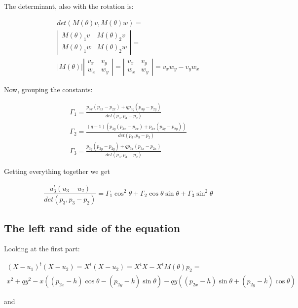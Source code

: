 \documentclass{article}
\begin{document}
The determinant, also with the rotation is:

\begin{align*}
det(M(\theta)v, M(\theta)w)=\\
\left|\begin{array}{cc}M(\theta)_1 v & M(\theta)_2v\\ M(\theta)_1 w & M(\theta)_2w\end{array}\right|=\\
|M(\theta)|\left|\begin{array}{cc} v_x & v_y \\ w_x & w_y \end{array}\right|=\left|\begin{array}{cc} v_x & v_y \\ w_x & w_y \end{array}\right|=v_xw_y - v_yw_x
\end{align*}

Now, grouping the constants:

\begin{align*}
\Gamma_1 = \frac{p_{3x}(p_{3x}-p_{2x}) + qp_{3y}(p_{3y}-p_{2y})}{det(p_3, p_3-p_2)}\\
\Gamma_2 = \frac{(q-1)(p_{3y}(p_{3x}-p_{2x})+p_{3x}(p_{3y}-p_{2y}))}{det(p_3, p_3-p_2)}\\
\Gamma_3 = \frac{p_{3y}(p_{3y}-p_{2y}) + qp_{3x}(p_{3x}-p_{2x})}{det(p_3,p_3-p_2)}
\end{align*}

Getting everything together we get

\newcommand{\rhse}{\Gamma_1\cos^2{\theta} + \Gamma_2\cos{\theta}\sin{\theta} + \Gamma_3\sin^2{\theta}}

\begin{align}
\dfrac{u_3^t(u_3-u_2)}{det(p_3, p_3-p_2)}=\rhse
\end{align}

\subsection{The left rand side of the equation}
Looking at the first part:

\begin{align*}
 	(X-u_1)^t(X-u_2)=X^t(X-u_2)=X^tX -X^tM(\theta)p_2=\\
 	x^2 + qy^2 - x((p_{2x}-h)\cos{\theta} - (p_{2y}-k)\sin{\theta}) - qy((p_{2x}-h)\sin{\theta} + (p_{2y}-k)\cos{\theta})
\end{align*}

and
\end{document}
